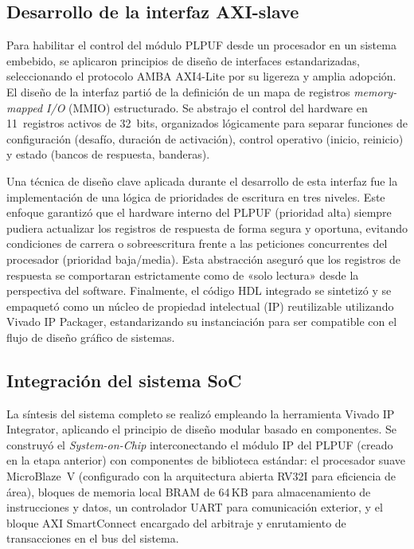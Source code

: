 \subsection{Desarrollo de la interfaz AXI-slave}
\label{sec:proc_axi}

Para habilitar el control del módulo PLPUF desde un procesador en un sistema
embebido, se aplicaron principios de diseño de interfaces estandarizadas,
seleccionando el protocolo AMBA AXI4-Lite por su ligereza y amplia adopción. El
diseño de la interfaz partió de la definición de un mapa de registros
\textit{memory-mapped I/O} (MMIO) estructurado. Se abstrajo el control del
hardware en 11~registros activos de 32~bits, organizados lógicamente para separar
funciones de configuración (desafío, duración de activación), control operativo
(inicio, reinicio) y estado (bancos de respuesta, banderas).

Una técnica de diseño clave aplicada durante el desarrollo de esta interfaz fue
la implementación de una lógica de prioridades de escritura en tres niveles.
Este enfoque garantizó que el hardware interno del PLPUF (prioridad alta) siempre
pudiera actualizar los registros de respuesta de forma segura y oportuna, evitando
condiciones de carrera o sobreescritura frente a las peticiones concurrentes del
procesador (prioridad baja/media). Esta abstracción aseguró que los registros
de respuesta se comportaran estrictamente como de «solo lectura» desde la
perspectiva del software. Finalmente, el código HDL integrado se sintetizó y se
empaquetó como un núcleo de propiedad intelectual (IP) reutilizable utilizando
Vivado IP Packager, estandarizando su instanciación para ser compatible con el
flujo de diseño gráfico de sistemas.

\subsection{Integración del sistema SoC}
\label{sec:proc_soc}

La síntesis del sistema completo se realizó empleando la herramienta Vivado IP
Integrator, aplicando el principio de diseño modular basado en componentes. Se
construyó el \textit{System-on-Chip} interconectando el módulo IP del PLPUF
(creado en la etapa anterior) con componentes de biblioteca estándar: el
procesador suave MicroBlaze~V (configurado con la arquitectura abierta RV32I para
eficiencia de área), bloques de memoria local BRAM de 64\,KB para
almacenamiento de instrucciones y datos, un controlador UART para comunicación
exterior, y el bloque AXI SmartConnect encargado del arbitraje y enrutamiento
de transacciones en el bus del sistema.


